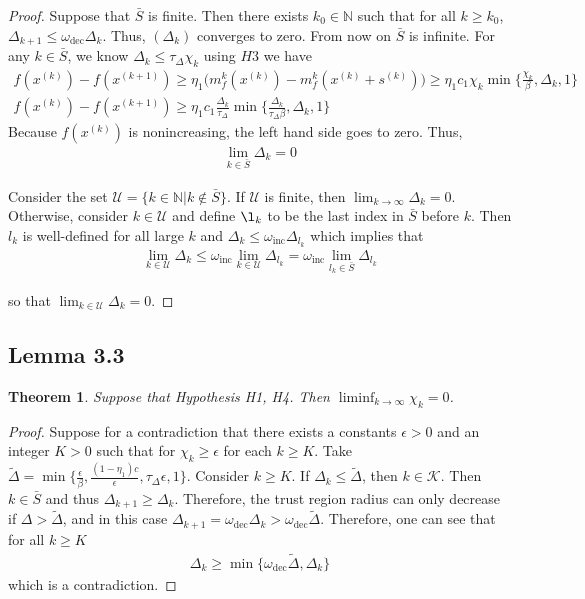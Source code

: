 \documentclass{article}
\newtheorem{theorem}{Theorem}
\newcommand{\xk}{{x}^{(k)}}
\newcommand{\ints}{\mathbb N}
\newcommand{\dk}{\Delta_k}
\newcommand{\pik}{\chi_k}
\newcommand{\sk}{{s^{(k)}}}
\newcommand{\mk}{{m_f^{k}}}
\newcommand{\xkpo}{{{x}^{(k+1)}}}
\newcommand{\dkpo}{\Delta_{k+1}}
\newcommand{\tone}{\omega_{\text{dec}}}
\newcommand{\ttwo}{\omega_{\text{inc}}}
\newcommand{\oalpha}{\tau_{\Delta}}
\begin{document}
\begin{proof}

Suppose that $\bar{S}$ is finite. Then there exists $k_0 \in \ints$ such that for all $k \ge  k_0$, $\dkpo \le \tone \dk$.
Thus, $(\dk)$ converges to zero.
From now on $\bar{S}$ is infinite.
For any $k \in \bar{S}$, we know $\dk \le \oalpha \pik$ using $H3$ we have
\begin{align*}
f(\xk) -  f(\xkpo) \ge \eta_1 \big (\mk(\xk) - \mk(\xk + \sk)\big ) \ge \eta_1 c_1 \pik \min\{\frac{\pik}{\beta}, \dk, 1\}\\
f(\xk) - f(\xkpo) \ge \eta_1c_1\frac{\dk}{\oalpha}\min\{\frac{\dk}{\oalpha \beta}, \dk, 1\}
\end{align*}
Because $f(\xk)$ is nonincreasing, the left hand side goes to zero.
Thus,
\begin{align}
\lim_{k \in \bar{S}} \dk = 0
\end{align}


Consider the set
$\mathcal U = \{ k \in \ints | k \not \in \bar S \}$.
If $\mathcal U$ is finite, then $\lim_{k\to\infty}\dk = 0$.
Otherwise, consider $k \in \mathcal U$ and define $\l_k$ to be the last index in $\bar S$ before $k$.
Then $l_k$ is well-defined for all large $k$  and $\dk \le \ttwo \Delta_{l_k}$ which implies that
\begin{align}
\lim_{k \in \mathcal U } \dk \le \ttwo \lim_{k \in \mathcal U} \Delta_{l_k} = \ttwo \lim_{l_k \in \bar{S}} \Delta_{l_k}
\end{align}

so that $\lim_{k \in \mathcal U} \dk = 0$.

\end{proof}




\subsection{Lemma 3.3}
\begin{theorem}
Suppose that Hypothesis H1, H4. Then $\liminf_{k\to\infty} \pik = 0$.
\end{theorem}
 
\begin{proof}
Suppose for a contradiction that there exists a constants $\epsilon > 0$ and an integer $K > 0$ such that for $\pik \ge \epsilon$ for each $k \ge K$.
Take $ \tilde \Delta = \min \{\frac{\epsilon}{\beta}, \frac{(1 - \eta_1)c}{\epsilon}, \oalpha \epsilon, 1\}$.
Consider $k \ge K$.
If $\dk \le \tilde \Delta$, then $k \in \mathcal K$.
Then $k \in \bar S$ and thus $\dkpo \ge \dk$.
Therefore, the trust region radius can only decrease if $\Delta > \tilde \Delta$, and in this case $\dkpo = \tone\dk > \tone \tilde \Delta$.
Therefore, one can see that for all $k \ge K$
\begin{align}
\dk \ge \min\{\tone \tilde \Delta, \dk \}
\end{align}
which is a contradiction.
\end{proof}
\end{document}
